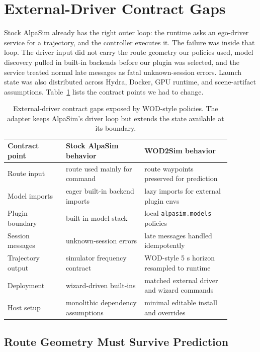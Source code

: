\documentclass{article}
\begin{document}
\section{External-Driver Contract Gaps}

Stock AlpaSim already has the right outer loop: the runtime asks an ego-driver service
for a trajectory, and the controller executes it. The failure was inside that loop. The
driver input did not carry the route geometry our policies used, model discovery pulled
in built-in backends before our plugin was selected, and the service treated normal late
messages as fatal unknown-session errors. Launch state was also distributed across
Hydra, Docker, GPU runtime, and scene-artifact assumptions. Table~\ref{tab:stock_vs_adapted}
lists the contract points we had to change.

\begin{table}[t]
\centering
\small
\begin{tabular}{p{0.23\linewidth}p{0.31\linewidth}p{0.34\linewidth}}
\toprule
Contract point & Stock AlpaSim behavior & WOD2Sim behavior \\
\midrule
Route input & route used mainly for command & route waypoints preserved for prediction \\
Model imports & eager built-in backend imports & lazy imports for external plugin envs \\
Plugin boundary & built-in model stack & local \texttt{alpasim.models} policies \\
Session messages & unknown-session errors & late messages handled idempotently \\
Trajectory output & simulator frequency contract & WOD-style 5 s horizon resampled to runtime \\
Deployment & wizard-driven built-ins & matched external driver and wizard commands \\
Host setup & monolithic dependency assumptions & minimal editable install and overrides \\
\bottomrule
\end{tabular}
\caption{External-driver contract gaps exposed by WOD-style policies. The adapter keeps
AlpaSim's driver loop but extends the state available at its boundary.}
\label{tab:stock_vs_adapted}
\end{table}

\subsection{Route Geometry Must Survive Prediction}
\end{document}
